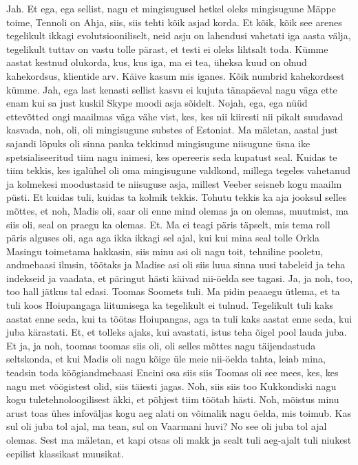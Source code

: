 Jah.
Et ega, ega sellist, nagu et mingisugusel hetkel oleks mingisugune Mäppe toime, Tennoli on Ahja, siis, siis tehti kõik asjad korda. Et kõik, kõik see arenes tegelikult ikkagi evolutsiooniliselt, neid asju on lahendusi vahetati iga aasta välja, tegelikult tuttav on vastu tolle pärast, et testi ei oleks lihtsalt toda. Kümme aastat kestnud olukorda, kus, kus iga, ma ei tea, üheksa kuud on olnud kahekordsus, klientide arv.
Käive kasum mis iganes. Kõik numbrid kahekordsest kümme.
Jah, ega last kenasti sellist kasvu ei kujuta tänapäeval nagu väga ette enam kui sa just kuskil Skype moodi asja sõidelt.
Nojah, ega, ega nüüd ettevõtted ongi maailmas väga vähe vist, kes, kes nii kiiresti nii pikalt suudavad kasvada, noh, oli, oli mingisugune substes of Estoniat.
Ma mäletan, aastal just sajandi lõpuks oli sinna panka tekkinud mingisugune niisugune üsna ike spetsialiseeritud tiim nagu inimesi, kes opereeris seda kupatust seal. Kuidas te tiim tekkis, kes igalühel oli oma mingisugune valdkond, millega tegeles vahetanud ja kolmekesi moodustasid te niisuguse asja, millest Veeber seisneb kogu maailm püsti. Et kuidas tuli, kuidas ta kolmik tekkis.
Tohutu tekkis ka aja jooksul selles mõttes, et noh, Madis oli, saar oli enne mind olemas ja on olemas, muutmist, ma siis oli, seal on praegu ka olemas. Et.
Ma ei teagi päris täpselt, mis tema roll päris alguses oli, aga aga ikka ikkagi sel ajal, kui kui mina seal tolle Orkla Masingu toimetama hakkasin, siis minu asi oli nagu toit, tehniline pooletu, andmebaasi ilmsin, töötaks ja Madise asi oli siis luua sinna uusi tabeleid ja teha indekseid ja vaadata, et päringut hästi käivad nii-öelda see tagasi. Ja, ja noh, too, too hall jätkus tal edasi. Toomas Soomets tuli.
Ma pidin peaaegu ütlema, et ta tuli koos Hoiupangaga liitumisega ka tegelikult ei tulnud. Tegelikult tuli kaks aastat enne seda, kui ta töötas Hoiupangas, aga ta tuli kaks aastat enne seda, kui juba kärastati. Et, et tolleks ajaks, kui avastati, istus teha õigel pool lauda juba.
Et ja, ja noh, toomas toomas siis oli, oli selles mõttes nagu täijendastuda seltskonda, et kui Madis oli nagu kõige üle meie nii-öelda tahta, leiab mina, teadsin toda köögiandmebaasi Encini osa siis siis Toomas oli see mees, kes, kes nagu met vöögistest olid, siis täiesti jagas. Noh, siis siis too Kukkondiski nagu kogu tuletehnoloogilisest äkki, et põhjest tiim töötab hästi. Noh, mõistus minu arust toas ühes infoväljas kogu aeg alati on võimalik nagu öelda, mis toimub.
Kas sul oli juba tol ajal, ma tean, sul on Vaarmani huvi? No see oli juba tol ajal olemas. Sest ma mäletan, et kapi otsas oli makk ja sealt tuli aeg-ajalt tuli niukest eepilist klassikast muusikat.

